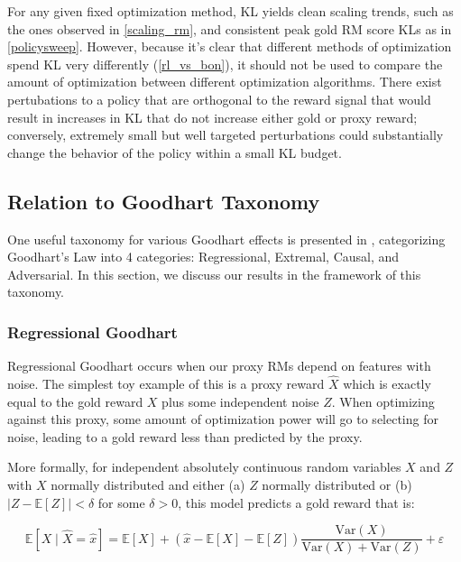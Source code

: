 \documentclass{article}
\theoremstyle{plain}
\begin{document}
For any given fixed optimization method, KL yields clean scaling trends, such as the ones observed in \cref{scaling_rm}, and consistent peak gold RM score KLs as in \cref{policysweep}. However, because it's clear that different methods of optimization spend KL very differently (\cref{rl_vs_bon}), it should not be used to compare the amount of optimization between different optimization algorithms. There exist pertubations to a policy that are orthogonal to the reward signal that would result in increases in KL that do not increase either gold or proxy reward; conversely, extremely small but well targeted perturbations could substantially change the behavior of the policy within a small KL budget.











\subsection{Relation to Goodhart Taxonomy}\label{implications_optim}

One useful taxonomy for various Goodhart effects is presented in \citet{manheim2018categorizing}, categorizing Goodhart's Law into 4 categories: Regressional, Extremal, Causal, and Adversarial. In this section, we discuss our results in the framework of this taxonomy.


\subsubsection{Regressional Goodhart}\label{regressional_goodharting}

Regressional Goodhart occurs when our proxy RMs depend on features with noise. The simplest toy example of this is a proxy reward $\hat X$ which is exactly equal to the gold reward $X$ plus some independent noise $Z$. When optimizing against this proxy, some amount of optimization power will go to selecting for noise, leading to a gold reward less than predicted by the proxy. 

More formally, for independent absolutely continuous random variables $X$ and $Z$ with $X$ normally distributed and either
(a) $Z$ normally distributed or (b) $\left|Z-\mathbb E\left[Z\right]\right|<\delta$ for some $\delta>0$, this model predicts a gold reward that is:

\begin{equation}\label{eq:reg_goodhart}
    \mathbb E[X \mid \hat X = \hat x] = \mathbb E[X] + \left(\hat x - \mathbb E[X] - \mathbb E[Z]\right) \frac{\mathrm{Var}(X)}{\mathrm{Var}(X) + \mathrm{Var}(Z)}+\varepsilon
\end{equation}
\end{document}
